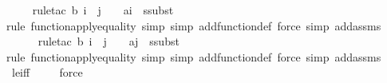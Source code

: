 \begin{isabellebody}
\ \ \ \ \isamarkupfalse%
{\isacharparenleft}{\kern0pt}rule{\isacharunderscore}{\kern0pt}tac\ b{\isacharequal}{\kern0pt}{\isachardoublequoteopen}{\isacharbraceleft}{\kern0pt}{\isasymlangle}{}{\isacharcomma}{\kern0pt}\ i{\isasymrangle}{\isacharcomma}{\kern0pt}\ {\isasymlangle}{}{\isacharcomma}{\kern0pt}\ j{\isasymrangle}{\isacharbraceright}{\kern0pt}\ {\isacharbackquote}{\kern0pt}\ {}{\isachardoublequoteclose}\ \ a{\isacharequal}{\kern0pt}i\ \ ssubst{\isacharparenright}{\kern0pt}\isanewline
\ \ \ \ \ \isamarkupfalse%
{\isacharparenleft}{\kern0pt}rule\ function{\isacharunderscore}{\kern0pt}apply{\isacharunderscore}{\kern0pt}equality{\isacharcomma}{\kern0pt}\ simp{\isacharcomma}{\kern0pt}\ simp\ add{\isacharcolon}{\kern0pt}function{\isacharunderscore}{\kern0pt}def{\isacharcomma}{\kern0pt}\ force{\isacharcomma}{\kern0pt}\ simp\ add{\isacharcolon}{\kern0pt}assms{\isacharparenright}{\kern0pt}\isanewline
\ \ \ \ \ \isamarkupfalse%
{\isacharparenleft}{\kern0pt}rule{\isacharunderscore}{\kern0pt}tac\ b{\isacharequal}{\kern0pt}{\isachardoublequoteopen}{\isacharbraceleft}{\kern0pt}{\isasymlangle}{}{\isacharcomma}{\kern0pt}\ i{\isasymrangle}{\isacharcomma}{\kern0pt}\ {\isasymlangle}{}{\isacharcomma}{\kern0pt}\ j{\isasymrangle}{\isacharbraceright}{\kern0pt}\ {\isacharbackquote}{\kern0pt}\ {}{\isachardoublequoteclose}\ \ a{\isacharequal}{\kern0pt}j\ \ ssubst{\isacharparenright}{\kern0pt}\isanewline
\ \ \ \ \isamarkupfalse%
{\isacharparenleft}{\kern0pt}rule\ function{\isacharunderscore}{\kern0pt}apply{\isacharunderscore}{\kern0pt}equality{\isacharcomma}{\kern0pt}\ simp{\isacharcomma}{\kern0pt}\ simp\ add{\isacharcolon}{\kern0pt}function{\isacharunderscore}{\kern0pt}def{\isacharcomma}{\kern0pt}\ force{\isacharcomma}{\kern0pt}\ simp\ add{\isacharcolon}{\kern0pt}assms{\isacharparenright}{\kern0pt}\isanewline
\ \ \isamarkupfalse%
\ le{\isacharunderscore}{\kern0pt}iff\ \isanewline
\ \ \isamarkupfalse%
\ force\isanewline
\ \ \isamarkupfalse%
%
\endisatagproof
{\isafoldproof}%
%
\isadelimproof
\ \ \ \ \ \ \ \ \ \ \ \ \ \ \ \ \ \ \ \ \ \ \ \ \ \ \ \ \isanewline
%
\endisadelimproof
\isanewline
{}\isamarkupfalse%
\isanewline
\isanewline
{}\isamarkupfalse%

\end{isabellebody}

